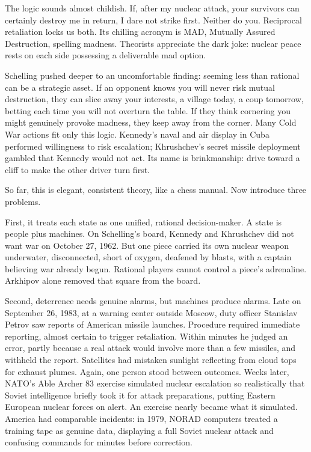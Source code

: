 The logic sounds almost childish. If, after my nuclear attack, your survivors can certainly destroy me in return, I dare not strike first. Neither do you. Reciprocal retaliation locks us both. Its chilling acronym is MAD, Mutually Assured Destruction, spelling madness. Theorists appreciate the dark joke: nuclear peace rests on each side possessing a deliverable mad option.

Schelling pushed deeper to an uncomfortable finding: seeming less than rational can be a strategic asset. If an opponent knows you will never risk mutual destruction, they can slice away your interests, a village today, a coup tomorrow, betting each time you will not overturn the table. If they think cornering you might genuinely provoke madness, they keep away from the corner. Many Cold War actions fit only this logic. Kennedy's naval and air display in Cuba performed willingness to risk escalation; Khrushchev's secret missile deployment gambled that Kennedy would not act. Its name is brinkmanship: drive toward a cliff to make the other driver turn first.

So far, this is elegant, consistent theory, like a chess manual. Now introduce three problems.

First, it treats each state as one unified, rational decision-maker. A state is people plus machines. On Schelling's board, Kennedy and Khrushchev did not want war on October 27, 1962. But one piece carried its own nuclear weapon underwater, disconnected, short of oxygen, deafened by blasts, with a captain believing war already begun. Rational players cannot control a piece's adrenaline. Arkhipov alone removed that square from the board.

Second, deterrence needs genuine alarms, but machines produce alarms. Late on September 26, 1983, at a warning center outside Moscow, duty officer Stanislav Petrov saw reports of American missile launches. Procedure required immediate reporting, almost certain to trigger retaliation. Within minutes he judged an error, partly because a real attack would involve more than a few missiles, and withheld the report. Satellites had mistaken sunlight reflecting from cloud tops for exhaust plumes. Again, one person stood between outcomes. Weeks later, NATO's Able Archer 83 exercise simulated nuclear escalation so realistically that Soviet intelligence briefly took it for attack preparations, putting Eastern European nuclear forces on alert. An exercise nearly became what it simulated. America had comparable incidents: in 1979, NORAD computers treated a training tape as genuine data, displaying a full Soviet nuclear attack and confusing commands for minutes before correction.

